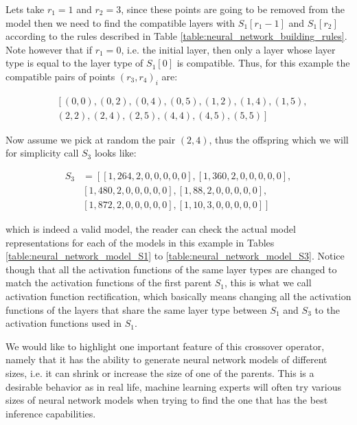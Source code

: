 \documentclass[journal]{IEEEtran}
\begin{document}
Lets take $r_1 = 1$ and $r_2 = 3$, since these points are going to be removed from the model then we need to find the compatible layers with $S_1[r_1-1]$ and $S_1[r_2]$ according to the rules described in Table \ref{table:neural_network_building_rules}. Note however that if $r_1 = 0$, i.e. the initial layer, then only a layer whose layer type is equal to the layer type of $S_1[0]$ is compatible. Thus, for this example the compatible pairs of points $(r_3, r_4)_i$ are:

\begin{align*}
& \left[ (0, 0), (0, 2), (0, 4), (0, 5), (1, 2), (1, 4), (1, 5), \right. \\
& \left. (2, 2), (2, 4), (2, 5), (4, 4), (4, 5), (5, 5) \right]
\end{align*} 

Now assume we pick at random the pair $(2,4)$, thus the offspring which we will for simplicity call $S_3$ looks like:

\begin{align*}
S_3 & = \left[ \left[1, 264, 2, 0, 0, 0, 0, 0 \right], \left[1, 360, 2, 0, 0, 0, 0, 0 \right], \right. \\
& \left. \left[1, 480, 2, 0, 0, 0, 0, 0 \right] , \left[1, 88, 2, 0, 0, 0, 0, 0 \right], \right. \\
& \left. \left[1, 872, 2, 0, 0, 0, 0, 0 \right], \left[1, 10, 3, 0, 0, 0, 0, 0 \right] \right]
\end{align*}

which is indeed a valid model, the reader can check the actual model representations for each of the models in this example in Tables \ref{table:neural_network_model_S1} to \ref{table:neural_network_model_S3}. Notice though that all the activation functions of the same layer types are changed to match the activation functions of the first parent $S_1$, this is what we call activation function rectification, which basically means changing all the activation functions of the layers that share the same layer type between $S_1$ and $S_3$ to the activation functions used in $S_1$. 

We would like to highlight one important feature of this crossover operator, namely that it has the ability to generate neural network models of different sizes, i.e. it can shrink or increase the size of one of the parents. This is a desirable behavior as in real life, machine learning experts will often try various sizes of neural network models when trying to find the one that has the best inference capabilities.
\end{document}
